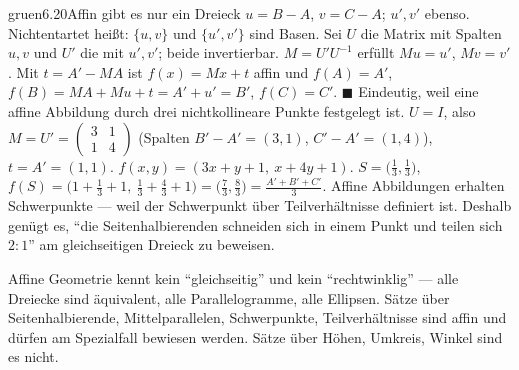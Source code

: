 \begin{loesungkarte}{gruen}{6.20}{Affin gibt es nur ein Dreieck}
$u = B - A$, $v = C - A$; $u', v'$ ebenso. Nichtentartet heißt: $\{u, v\}$ und $\{u', v'\}$ sind Basen. Sei $U$ die Matrix mit Spalten $u, v$ und $U'$ die mit $u', v'$; beide invertierbar. $M = U'U^{-1}$ erfüllt $Mu = u'$, $Mv = v'$. Mit $t = A' - MA$ ist $f(x) = Mx + t$ affin und $f(A) = A'$, $f(B) = MA + Mu + t = A' + u' = B'$, $f(C) = C'$. $\blacksquare$ Eindeutig, weil eine affine Abbildung durch drei nichtkollineare Punkte festgelegt ist.
$U = I$, also $M = U' = \begin{pmatrix}3 & 1\\ 1 & 4\end{pmatrix}$ (Spalten $B' - A' = (3, 1)$, $C' - A' = (1, 4)$), $t = A' = (1, 1)$. $f(x, y) = (3x + y + 1,\ x + 4y + 1)$.
$S = \bigl(\frac13, \frac13\bigr)$, $f(S) = \bigl(1 + \frac13 + 1,\ \frac13 + \frac43 + 1\bigr) = \bigl(\frac73, \frac83\bigr) = \frac{A' + B' + C'}3$. Affine Abbildungen erhalten Schwerpunkte --- weil der Schwerpunkt über Teilverhältnisse definiert ist. Deshalb genügt es, \enquote{die Seitenhalbierenden schneiden sich in einem Punkt und teilen sich $2 : 1$} am gleichseitigen Dreieck zu beweisen.
\begin{mitnehmen}\kastentext
Affine Geometrie kennt kein \enquote{gleichseitig} und kein \enquote{rechtwinklig} --- alle Dreiecke sind äquivalent, alle Parallelogramme, alle Ellipsen. Sätze über Seitenhalbierende, Mittelparallelen, Schwerpunkte, Teilverhältnisse sind affin und dürfen am Spezialfall bewiesen werden. Sätze über Höhen, Umkreis, Winkel sind es nicht.
\end{mitnehmen}
\end{loesungkarte}

